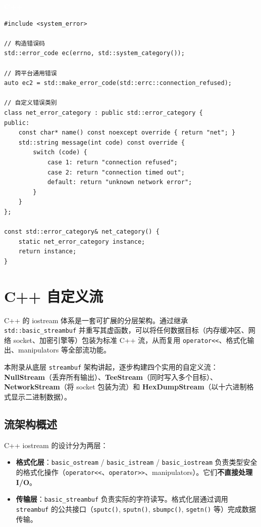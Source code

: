 \documentclass[12pt,a4paper,fontset=fandol]{ctexbook}
\newcommand{\Fn}[1]{\texttt{#1()}}
\newcommand{\Tp}[1]{\texttt{#1}}
\newcommand{\cpplabel}{%
  \noindent\begin{tcolorbox}[sharp corners,colback=algheadbg,colframe=algheadbg,
    left=6pt,right=6pt,top=2pt,bottom=2pt,boxrule=0pt]
  \textcolor{white}{\small\bfseries\sffamily C++}\end{tcolorbox}%
}
\begin{document}
\cpplabel
\begin{lstlisting}
#include <system_error>

// 构造错误码
std::error_code ec(errno, std::system_category());

// 跨平台通用错误
auto ec2 = std::make_error_code(std::errc::connection_refused);

// 自定义错误类别
class net_error_category : public std::error_category {
public:
    const char* name() const noexcept override { return "net"; }
    std::string message(int code) const override {
        switch (code) {
            case 1: return "connection refused";
            case 2: return "connection timed out";
            default: return "unknown network error";
        }
    }
};

const std::error_category& net_category() {
    static net_error_category instance;
    return instance;
}
\end{lstlisting}

\chapter{C++ 自定义流}

C++ 的 iostream 体系是一套可扩展的分层架构。通过继承 \Tp{std::basic\_streambuf} 并重写其虚函数，可以将任何数据目标（内存缓冲区、网络 socket、加密引擎等）包装为标准 C++ 流，从而复用 \Tp{operator<<}、格式化输出、manipulators 等全部流功能。

本附录从底层 \Tp{streambuf} 架构讲起，逐步构建四个实用的自定义流：\textbf{NullStream}（丢弃所有输出）、\textbf{TeeStream}（同时写入多个目标）、\textbf{NetworkStream}（将 socket 包装为流）和 \textbf{HexDumpStream}（以十六进制格式显示二进制数据）。

\section{流架构概述}

C++ iostream 的设计分为两层：

\begin{itemize}
\item \textbf{格式化层}：\Tp{basic\_ostream} / \Tp{basic\_istream} / \Tp{basic\_iostream} 负责类型安全的格式化操作（\Tp{operator<<}、\Tp{operator>>}、manipulators）。它们\textbf{不直接处理 I/O}。
\item \textbf{传输层}：\Tp{basic\_streambuf} 负责实际的字符读写。格式化层通过调用 \Tp{streambuf} 的公共接口（\Fn{sputc}, \Fn{sputn}, \Fn{sbumpc}, \Fn{sgetn} 等）完成数据传输。
\end{itemize}
\end{document}
